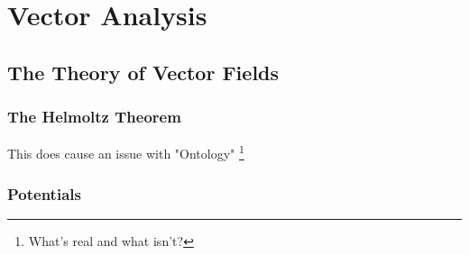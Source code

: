 \chapter{Vector Analysis}

\section{The Theory of Vector Fields}
\subsection{The Helmoltz Theorem}
This does cause an issue with "Ontology" \footnote{What's real and what isn't?}
\subsection{Potentials}